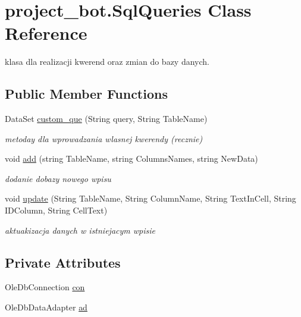 \hypertarget{classproject__bot_1_1_sql_queries}{}\section{project\+\_\+bot.\+Sql\+Queries Class Reference}
\label{classproject__bot_1_1_sql_queries}


klasa dla realizacji kwerend oraz zmian do bazy danych.  


\subsection*{Public Member Functions}
\begin{DoxyCompactItemize}
\item 
Data\+Set \hyperlink{classproject__bot_1_1_sql_queries_aa2262a95cf3b8460641b79663ad7509e}{custom\+\_\+que} (String query, String Table\+Name)
\begin{DoxyCompactList}\small\item\em metoday dla wprowadzania wlasnej kwerendy (recznie) \end{DoxyCompactList}\item 
void \hyperlink{classproject__bot_1_1_sql_queries_a37c51368541d5d165f188a45df680c26}{add} (string Table\+Name, string Columns\+Names, string New\+Data)
\begin{DoxyCompactList}\small\item\em dodanie dobazy nowego wpisu \end{DoxyCompactList}\item 
void \hyperlink{classproject__bot_1_1_sql_queries_a1fddf4e1d2ecebfb016f1231925c59ff}{update} (String Table\+Name, String Column\+Name, String Text\+In\+Cell, String I\+D\+Column, String Cell\+Text)
\begin{DoxyCompactList}\small\item\em aktuakizacja danych w istniejacym wpisie \end{DoxyCompactList}\end{DoxyCompactItemize}
\subsection*{Private Attributes}
\begin{DoxyCompactItemize}
\item 
Ole\+Db\+Connection \hyperlink{classproject__bot_1_1_sql_queries_a88f05b8fbe30a50c5a365460137c1343}{con}
\item 
Ole\+Db\+Data\+Adapter \hyperlink{classproject__bot_1_1_sql_queries_a25a5b361f284f2e985069dd3b9ff5036}{ad}
\end{DoxyCompactItemize}


